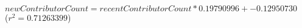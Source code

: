 $\mathit{newContributorCount} = \mathit{recentContributorCount} * 0.19790996 + -0.12950730$\\($r^2 = 0.71263399$)